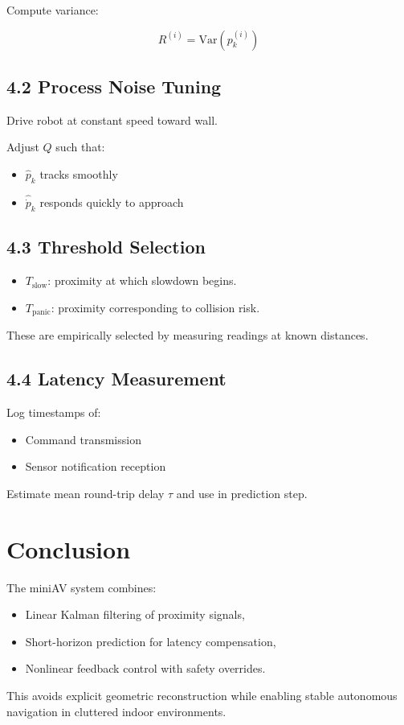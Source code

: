 \documentclass[11pt]{article}
\begin{document}
Compute variance:

\[
R^{(i)} = \text{Var}(p_k^{(i)})
\]

\subsection*{4.2 Process Noise Tuning}

Drive robot at constant speed toward wall.

Adjust $Q$ such that:

\begin{itemize}
    \item $\hat{p}_k$ tracks smoothly
    \item $\hat{\dot{p}}_k$ responds quickly to approach
\end{itemize}

\subsection*{4.3 Threshold Selection}

\begin{itemize}
    \item $T_{\text{slow}}$: proximity at which slowdown begins.
    \item $T_{\text{panic}}$: proximity corresponding to collision risk.
\end{itemize}

These are empirically selected by measuring readings at known distances.

\subsection*{4.4 Latency Measurement}

Log timestamps of:

\begin{itemize}
    \item Command transmission
    \item Sensor notification reception
\end{itemize}

Estimate mean round-trip delay $\tau$ and use in prediction step.

\section{Conclusion}

The miniAV system combines:

\begin{itemize}
    \item Linear Kalman filtering of proximity signals,
    \item Short-horizon prediction for latency compensation,
    \item Nonlinear feedback control with safety overrides.
\end{itemize}

This avoids explicit geometric reconstruction while enabling stable
autonomous navigation in cluttered indoor environments.
\end{document}
